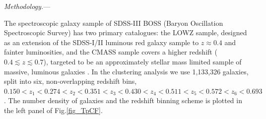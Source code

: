 \documentclass[prl,twocolumn,superscriptaddress,aps,amsmath,amssymb,nofootinbib,altaffilletter]{revtex4}
\begin{document}
{\it Methodology.}---

The spectroscopic galaxy sample of SDSS-III BOSS (Baryon Oscillation Spectroscopic Survey) has two primary catalogues:
the LOWZ sample, designed as an extension of the SDSS-I/II luminous red galaxy sample to $z\approx 0.4$ and fainter luminosities,
and the CMASS sample covers a higher redshift ($0.4\lesssim z \lesssim 0.7$),
targeted to be an approximately stellar mass limited sample of massive, luminous galaxies \cite{Reidetal:2016}.
In the clustering analysis we use 1,133,326 galaxies, split into six, non-overlapping redshift bins, 
$0.150<z_1<0.274<z_2<0.351<z_3<0.430<z_4<0.511<z_5<0.572<z_6<0.693$.
The number density of galaxies and the redshift binning scheme is plotted in the left panel of Fig.\ref{fig_TpCF}.
\end{document}
